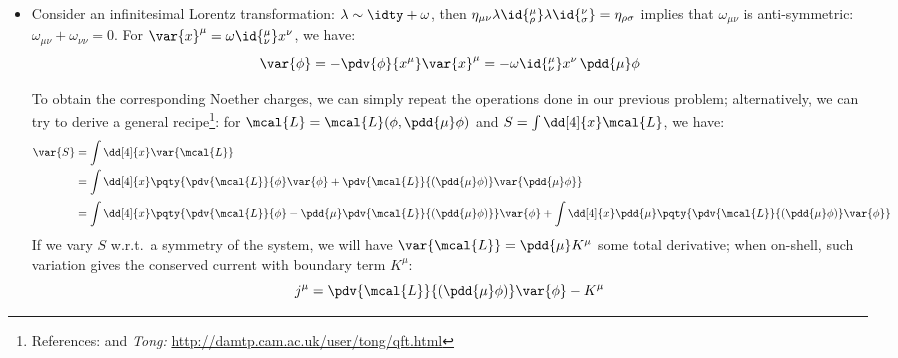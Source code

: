\documentclass[a4paper,10pt]{article}
\begin{document}
\begin{itemize}
	\item Consider an infinitesimal Lorentz transformation: $\lambda \sim \idty + \omega$, then $
		\eta_{\mu\nu}
			\lambda\id{^\mu_\rho}
			\lambda\id{^\nu_\sigma}
		= \eta_{\rho\sigma}
	$ implies that $\omega_{\mu\nu}$ is anti-symmetric: $
		\omega_{\mu\nu} + \omega_{\nu\nu} = 0
	$. For $
		\var{x}^\mu
		= \omega\id{^\mu_\nu} x^\nu
	$, we have:
	\begin{equation}
		\var{\phi} = - \pdv{\phi}{x^\mu}
			\var{x}^\mu
		= - \omega\id{^\mu_\nu} x^\nu\,
			\pdd{\mu}\phi
	\end{equation}
	
	To obtain the corresponding Noether charges, we can simply repeat the operations done in our previous problem; alternatively, we can try to derive a general recipe\footnote{
		References:  and \textit{Tong:} \url{http://damtp.cam.ac.uk/user/tong/qft.html}
	}: for $
		\mcal{L} = \mcal{L}(\phi,\pdd{\mu}\phi)
	$ and $
		S = \int \dd[4]{x} \mcal{L}
	$, we have:
	\begin{equation}
	\begin{aligned}
		\var{S}
		&= \int\dd[4]{x} \var{\mcal{L}} \\
		&= \int\dd[4]{x} \pqty{
			\pdv{\mcal{L}}{\phi} \var{\phi}
			+ \pdv{\mcal{L}}{(\pdd{\mu}\phi)}
				\var{\pdd{\mu}\phi}
		} \\[.5ex]
		&= \int\dd[4]{x} \pqty{
				\pdv{\mcal{L}}{\phi}
				- \pdd{\mu}
				\pdv{\mcal{L}}{(\pdd{\mu}\phi)}
			} \var{\phi}
		+ \int\dd[4]{x}
			\pdd{\mu} \pqty{
				\pdv{\mcal{L}}{(\pdd{\mu}\phi)}
				\var{\phi}
			}
	\end{aligned}
	\end{equation}
	If we vary $S$ w.r.t.\ a symmetry of the system, we will have $\var{\mcal{L}} = \pdd{\mu} K^\mu$ some total derivative; when on-shell, such variation gives the conserved current with boundary term $K^\mu$:
	\begin{equation}
		j^\mu
		= \pdv{\mcal{L}}{(\pdd{\mu}\phi)}
			\var{\phi} - K^\mu
	\end{equation}
	

\end{itemize}
\end{document}
